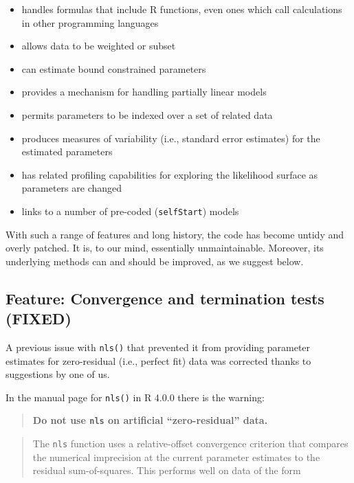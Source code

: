 \documentclass[
]{article}
\providecommand{\tightlist}{%
  \setlength{\itemsep}{0pt}\setlength{\parskip}{0pt}}
\begin{document}
\begin{itemize}
\tightlist
\item
  handles formulas that include R functions, even ones which call
  calculations in other programming languages
\item
  allows data to be weighted or subset
\item
  can estimate bound constrained parameters
\item
  provides a mechanism for handling partially linear models
\item
  permits parameters to be indexed over a set of related data
\item
  produces measures of variability (i.e., standard error estimates) for
  the estimated parameters
\item
  has related profiling capabilities for exploring the likelihood
  surface as parameters are changed
\item
  links to a number of pre-coded (\texttt{selfStart}) models
\end{itemize}

With such a range of features and long history, the code has become
untidy and overly patched. It is, to our mind, essentially
unmaintainable. Moreover, its underlying methods can and should be
improved, as we suggest below.

\hypertarget{feature-convergence-and-termination-tests-fixed}{%
\subsection{Feature: Convergence and termination tests
(FIXED)}\label{feature-convergence-and-termination-tests-fixed}}

A previous issue with \texttt{nls()} that prevented it from providing
parameter estimates for zero-residual (i.e., perfect fit) data was
corrected thanks to suggestions by one of us.

In the manual page for \texttt{nls()} in R 4.0.0 there is the warning:

\begin{quote}
\textbf{Do not use \texttt{nls} on artificial ``zero-residual'' data.}
\end{quote}

\begin{quote}
The \texttt{nls} function uses a relative-offset convergence criterion
that compares the numerical imprecision at the current parameter
estimates to the residual sum-of-squares. This performs well on data of
the form
\end{quote}
\end{document}
